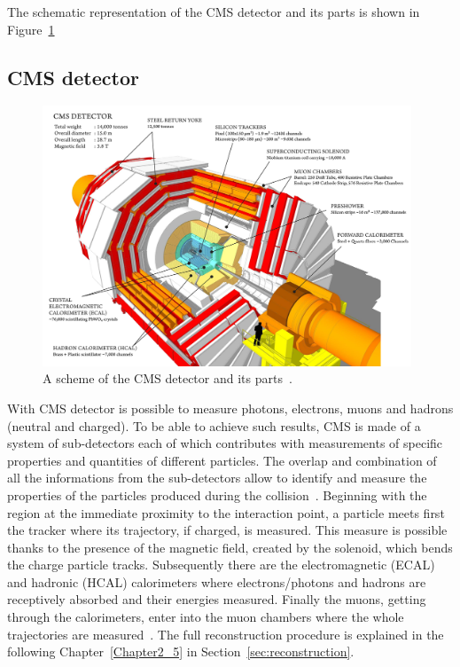 The schematic representation of the CMS detector and its parts is
shown in Figure~\ref{fig:detector}


\subsection{CMS detector}\label{sec:cmsdetector}
\begin{figure}[h]
\centering
\includegraphics[width=0.98\textwidth]{Figures/c2/cms_160312_06-compressed.pdf}
\vspace*{3mm}
\caption{A scheme of the CMS detector and its parts~\cite{webpage_cms}.}
\label{fig:detector}
\end{figure} 
With CMS detector is possible to measure photons, electrons, muons and hadrons (neutral and charged). 
To be able to achieve such results, CMS is made of a system of sub-detectors each of which contributes with
measurements of specific properties and quantities of different 
particles. The overlap and combination of all the
informations from the sub-detectors allow to identify and measure the
properties of the particles produced during the collision~\cite{CMS:particleflow}. Beginning
with the region at the immediate proximity to the interaction point, a
particle meets first the tracker where its trajectory, if charged, is
measured. This measure is possible thanks to the presence of the
magnetic field, created by the solenoid, which bends the charge
particle tracks. Subsequently there are the
electromagnetic (ECAL) and hadronic (HCAL) calorimeters where
electrons/photons and hadrons are receptively absorbed and their
energies measured. Finally the muons, getting through the
calorimeters, enter into the muon chambers where the whole trajectories
are measured~\cite{CMS:particleflow}. The full reconstruction
procedure is explained in the following Chapter~\ref{Chapter2_5} in Section~\ref{sec:reconstruction}.\\

